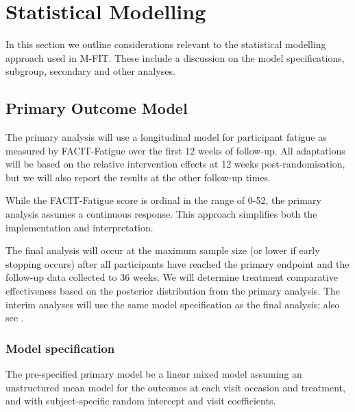 \documentclass[
]{article}
\begin{document}
\clearpage

\hypertarget{statistical-modelling}{%
  \section{Statistical Modelling}\label{statistical-modelling}}

In this section we outline considerations relevant to the statistical modelling approach used in M-FIT.
These include a discussion on the model specifications, subgroup, secondary and other analyses.

\hypertarget{primary-model}{%
  \subsection{Primary Outcome Model}\label{primary-model}}

The primary analysis will use a longitudinal model for participant fatigue as measured by FACIT-Fatigue over the first 12 weeks of follow-up.
All adaptations will be based on the relative intervention effects at 12 weeks post-randomisation, but we will also report the results at the other follow-up times.

While the FACIT-Fatigue score is ordinal in the range of 0-52, the primary analysis assumes a continuous response.
This approach simplifies both the implementation and interpretation.

The final analysis will occur at the maximum sample size (or lower if early stopping occurs) after all participants have reached the primary endpoint and the follow-up data collected to 36 weeks.
We will determine treatment comparative effectiveness based on the posterior distribution from the primary analysis.
The interim analyses will use the same model specification as the final analysis; also see .

\hypertarget{model-specification}{%
  \subsubsection{Model specification}\label{model-specification}}

The pre-specified primary model  be a linear mixed model assuming an unstructured mean model for the outcomes at each visit occasion and treatment, and with subject-specific random intercept and visit coefficients.
\end{document}
